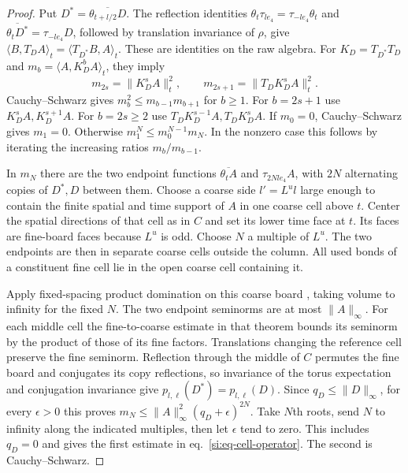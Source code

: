 \documentclass[11pt,letterpaper,reqno]{amsart}
\numberwithin{equation}{section}
\renewcommand{\eqref}[1]{\textup{eq.~\ref{#1}}}
\theoremstyle{definition}
\theoremstyle{remark}
\begin{document}
\begin{proof}
Put $D^*=\overline{\theta_{t+l/2}D}$. The reflection identities
$\theta_t\tau_{le_4}=\tau_{-le_4}\theta_t$ and
$\overline{\theta_tD^*}=\tau_{-le_4}D$, followed by translation
invariance of $\rho$, give
$\langle B,T_D A\rangle_t=\langle T_{D^*}B,A\rangle_t$.
These are identities on the raw algebra. For $K_D=T_{D^*}T_D$ and
$m_b=\langle A,K_D^b A\rangle_t$, they imply
\[
 m_{2s}=\|K_D^s A\|_t^2,\qquad
 m_{2s+1}=\|T_D K_D^s A\|_t^2 .
\]
Cauchy--Schwarz gives $m_b^2\le m_{b-1}m_{b+1}$ for $b\ge1$.
For $b=2s+1$ use $K_D^s A,K_D^{s+1} A$. For $b=2s\ge2$ use
$T_DK_D^{s-1}A,T_DK_D^sA$. If $m_0=0$, Cauchy--Schwarz gives
$m_1=0$. Otherwise $m_1^N\le m_0^{N-1}m_N$. In the nonzero
case this follows by iterating the increasing ratios
$m_b/m_{b-1}$.

In $m_N$ there are the two endpoint functions
$\overline{\theta_tA}$ and $\tau_{2Nle_4}A$, with $2N$ alternating
copies of $D^*,D$ between them. Choose a coarse side $l'=L^u l$
large enough to contain the finite spatial and time support of
$A$ in one coarse cell above $t$. Center the spatial directions
of that cell as in $C$ and set its lower time face at $t$. Its
faces are fine-board faces because $L^u$ is odd. Choose $N$ a
multiple of $L^u$. The two endpoints are then in separate
coarse cells outside the column. All used bonds of a constituent
fine cell lie in the open coarse cell containing it.

Apply fixed-spacing product domination on this coarse board
\cite[Theorem~C]{LP}, taking volume to infinity for the fixed
$N$. The two endpoint seminorms are at most $\|A\|_\infty$.
For each middle cell the fine-to-coarse estimate in that theorem
bounds its seminorm by the product of those of its fine factors.
Translations changing the reference cell preserve the fine
seminorm. Reflection through the middle of $C$ permutes the
fine board and conjugates its copy reflections, so invariance
of the torus expectation and conjugation invariance give
$p_{l,\ell}(D^*)=p_{l,\ell}(D)$. Since $q_D\le\|D\|_\infty$,
for every $\epsilon>0$ this proves
$m_N\le\|A\|_\infty^2(q_D+\epsilon)^{2N}$.
Take $N$th roots, send $N$ to infinity along the indicated
multiples, then let $\epsilon$ tend to zero. This includes
$q_D=0$ and gives the first estimate in
\eqref{si:eq-cell-operator}. The second is Cauchy--Schwarz.
\end{proof}
\end{document}
